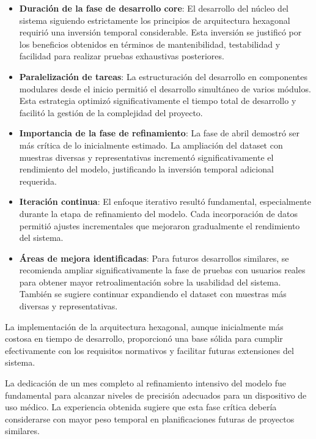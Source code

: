 \begin{itemize}
    \item \textbf{Duración de la fase de desarrollo core}: El desarrollo del núcleo del sistema siguiendo estrictamente los principios de arquitectura hexagonal requirió una inversión temporal considerable. Esta inversión se justificó por los beneficios obtenidos en términos de mantenibilidad, testabilidad y facilidad para realizar pruebas exhaustivas posteriores.
    
    \item \textbf{Paralelización de tareas}: La estructuración del desarrollo en componentes modulares desde el inicio permitió el desarrollo simultáneo de varios módulos. Esta estrategia optimizó significativamente el tiempo total de desarrollo y facilitó la gestión de la complejidad del proyecto.
    
    \item \textbf{Importancia de la fase de refinamiento}: La fase de abril demostró ser más crítica de lo inicialmente estimado. La ampliación del dataset con muestras diversas y representativas incrementó significativamente el rendimiento del modelo, justificando la inversión temporal adicional requerida.
    
    \item \textbf{Iteración continua}: El enfoque iterativo resultó fundamental, especialmente durante la etapa de refinamiento del modelo. Cada incorporación de datos permitió ajustes incrementales que mejoraron gradualmente el rendimiento del sistema.
    
    \item \textbf{Áreas de mejora identificadas}: Para futuros desarrollos similares, se recomienda ampliar significativamente la fase de pruebas con usuarios reales para obtener mayor retroalimentación sobre la usabilidad del sistema. También se sugiere continuar expandiendo el dataset con muestras más diversas y representativas.
\end{itemize}

La implementación de la arquitectura hexagonal, aunque inicialmente más costosa en tiempo de desarrollo, proporcionó una base sólida para cumplir efectivamente con los requisitos normativos y facilitar futuras extensiones del sistema.

La dedicación de un mes completo al refinamiento intensivo del modelo fue fundamental para alcanzar niveles de precisión adecuados para un dispositivo de uso médico. La experiencia obtenida sugiere que esta fase crítica debería considerarse con mayor peso temporal en planificaciones futuras de proyectos similares.